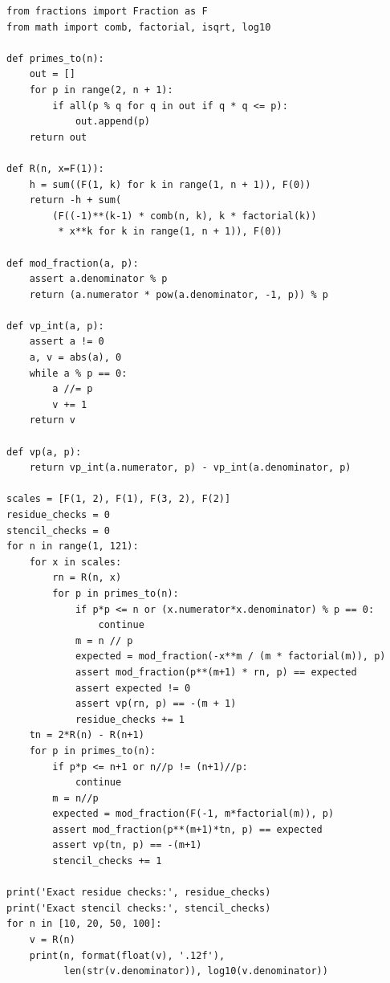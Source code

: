 \documentclass[11pt,a4paper]{article}
\theoremstyle{definition}
\theoremstyle{remark}
\numberwithin{equation}{section}
\begin{document}
\begin{lstlisting}
from fractions import Fraction as F
from math import comb, factorial, isqrt, log10

def primes_to(n):
    out = []
    for p in range(2, n + 1):
        if all(p % q for q in out if q * q <= p):
            out.append(p)
    return out

def R(n, x=F(1)):
    h = sum((F(1, k) for k in range(1, n + 1)), F(0))
    return -h + sum(
        (F((-1)**(k-1) * comb(n, k), k * factorial(k))
         * x**k for k in range(1, n + 1)), F(0))

def mod_fraction(a, p):
    assert a.denominator % p
    return (a.numerator * pow(a.denominator, -1, p)) % p

def vp_int(a, p):
    assert a != 0
    a, v = abs(a), 0
    while a % p == 0:
        a //= p
        v += 1
    return v

def vp(a, p):
    return vp_int(a.numerator, p) - vp_int(a.denominator, p)

scales = [F(1, 2), F(1), F(3, 2), F(2)]
residue_checks = 0
stencil_checks = 0
for n in range(1, 121):
    for x in scales:
        rn = R(n, x)
        for p in primes_to(n):
            if p*p <= n or (x.numerator*x.denominator) % p == 0:
                continue
            m = n // p
            expected = mod_fraction(-x**m / (m * factorial(m)), p)
            assert mod_fraction(p**(m+1) * rn, p) == expected
            assert expected != 0
            assert vp(rn, p) == -(m + 1)
            residue_checks += 1
    tn = 2*R(n) - R(n+1)
    for p in primes_to(n):
        if p*p <= n+1 or n//p != (n+1)//p:
            continue
        m = n//p
        expected = mod_fraction(F(-1, m*factorial(m)), p)
        assert mod_fraction(p**(m+1)*tn, p) == expected
        assert vp(tn, p) == -(m+1)
        stencil_checks += 1

print('Exact residue checks:', residue_checks)
print('Exact stencil checks:', stencil_checks)
for n in [10, 20, 50, 100]:
    v = R(n)
    print(n, format(float(v), '.12f'),
          len(str(v.denominator)), log10(v.denominator))
\end{lstlisting}
\end{document}
